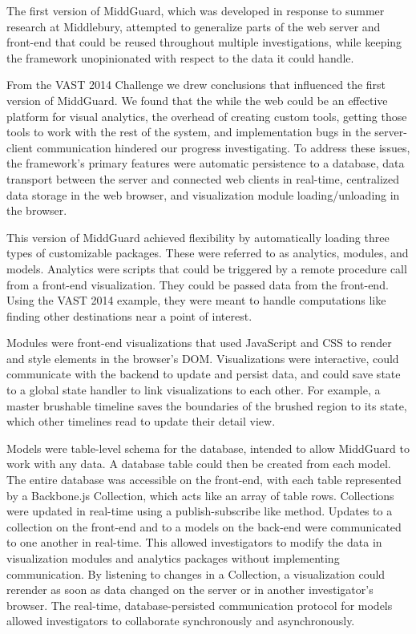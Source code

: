 \documentclass[midd]{thesis}
\begin{document}
The first version of MiddGuard, which was developed in response to summer
research at Middlebury, attempted to generalize parts of the web server and
front-end that could be reused throughout multiple investigations, while keeping
the framework unopinionated with respect to the data it could handle.

From the VAST 2014 Challenge we drew conclusions that influenced the first
version of MiddGuard. We found that the while the web could be an effective
platform for visual analytics, the overhead of creating custom tools, getting
those tools to work with the rest of the system, and implementation bugs in the
server-client communication hindered our progress investigating. To address
these issues, the framework's primary features were automatic persistence to a
database, data transport between the server and connected web clients in
real-time, centralized data storage in the web browser, and visualization module
loading/unloading in the browser.

This version of MiddGuard achieved flexibility by automatically loading three
types of customizable packages. These were referred to as analytics, modules,
and models. Analytics were scripts that could be triggered by a remote procedure
call from a front-end visualization. They could be passed data from the
front-end. Using the VAST 2014 example, they were meant to handle computations
like finding other destinations near a point of interest.

Modules were front-end visualizations that used JavaScript and CSS to render and
style elements in the browser's DOM. Visualizations were interactive, could
communicate with the backend to update and persist data, and could save state to
a global state handler to link visualizations to each other. For example, a
master brushable timeline saves the boundaries of the brushed region to its
state, which other timelines read to update their detail view.

Models were table-level schema for the database, intended to allow MiddGuard to
work with any data. A database table could then be created from each model. The
entire database was accessible on the front-end, with each table represented by
a Backbone.js Collection, which acts like an array of table rows. Collections
were updated in real-time using a publish-subscribe like method. Updates to a
collection on the front-end and to a models on the back-end were communicated to
one another in real-time. This allowed investigators to modify the data in
visualization modules and analytics packages without implementing communication.
By listening to changes in a Collection, a visualization could rerender as soon
as data changed on the server or in another investigator's browser. The
real-time, database-persisted communication protocol for models allowed
investigators to collaborate synchronously and asynchronously.
\end{document}
